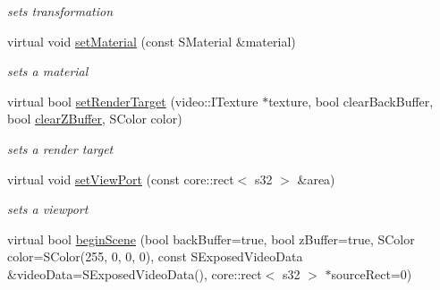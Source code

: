 \begin{DoxyCompactItemize}
\begin{DoxyCompactList}\small\item\em sets transformation \end{DoxyCompactList}\item 
\hypertarget{classirr_1_1video_1_1_c_software_driver_ab5f51c51641231e789b9be87b65a80a4}{virtual void \hyperlink{classirr_1_1video_1_1_c_software_driver_ab5f51c51641231e789b9be87b65a80a4}{set\-Material} (const S\-Material \&material)}\label{classirr_1_1video_1_1_c_software_driver_ab5f51c51641231e789b9be87b65a80a4}

\begin{DoxyCompactList}\small\item\em sets a material \end{DoxyCompactList}\item 
\hypertarget{classirr_1_1video_1_1_c_software_driver_a1e55257f41455609821ade94064d31cd}{virtual bool \hyperlink{classirr_1_1video_1_1_c_software_driver_a1e55257f41455609821ade94064d31cd}{set\-Render\-Target} (video\-::\-I\-Texture $\ast$texture, bool clear\-Back\-Buffer, bool \hyperlink{classirr_1_1video_1_1_c_software_driver_af7753ce2c17f7c7cbbc463dc97c0dc83}{clear\-Z\-Buffer}, S\-Color color)}\label{classirr_1_1video_1_1_c_software_driver_a1e55257f41455609821ade94064d31cd}

\begin{DoxyCompactList}\small\item\em sets a render target \end{DoxyCompactList}\item 
\hypertarget{classirr_1_1video_1_1_c_software_driver_a6bce0c6019906139f5be29a5acc17653}{virtual void \hyperlink{classirr_1_1video_1_1_c_software_driver_a6bce0c6019906139f5be29a5acc17653}{set\-View\-Port} (const core\-::rect$<$ s32 $>$ \&area)}\label{classirr_1_1video_1_1_c_software_driver_a6bce0c6019906139f5be29a5acc17653}

\begin{DoxyCompactList}\small\item\em sets a viewport \end{DoxyCompactList}\item 
\hypertarget{classirr_1_1video_1_1_c_software_driver_aa6810e911f7aab78e0279844f4398902}{virtual bool \hyperlink{classirr_1_1video_1_1_c_software_driver_aa6810e911f7aab78e0279844f4398902}{begin\-Scene} (bool back\-Buffer=true, bool z\-Buffer=true, S\-Color color=S\-Color(255, 0, 0, 0), const S\-Exposed\-Video\-Data \&video\-Data=S\-Exposed\-Video\-Data(), core\-::rect$<$ s32 $>$ $\ast$source\-Rect=0)}\label{classirr_1_1video_1_1_c_software_driver_aa6810e911f7aab78e0279844f4398902}


\end{DoxyCompactItemize}
